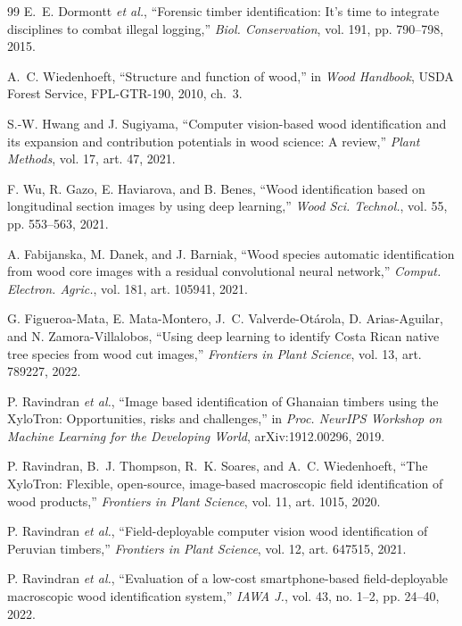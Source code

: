 \begin{thebibliography}{99}
E.~E. Dormontt \emph{et al.}, ``Forensic timber identification: It's time to integrate disciplines to combat illegal logging,'' \emph{Biol. Conservation}, vol. 191, pp. 790--798, 2015.

A.~C. Wiedenhoeft, ``Structure and function of wood,'' in \emph{Wood Handbook}, USDA Forest Service, FPL-GTR-190, 2010, ch.~3.

S.-W. Hwang and J. Sugiyama, ``Computer vision-based wood identification and its expansion and contribution potentials in wood science: A review,'' \emph{Plant Methods}, vol. 17, art. 47, 2021.

F. Wu, R. Gazo, E. Haviarova, and B. Benes, ``Wood identification based on longitudinal section images by using deep learning,'' \emph{Wood Sci. Technol.}, vol. 55, pp. 553--563, 2021.

A. Fabijanska, M. Danek, and J. Barniak, ``Wood species automatic identification from wood core images with a residual convolutional neural network,'' \emph{Comput. Electron. Agric.}, vol. 181, art. 105941, 2021.

G. Figueroa-Mata, E. Mata-Montero, J.~C. Valverde-Ot\'arola, D. Arias-Aguilar, and N. Zamora-Villalobos, ``Using deep learning to identify Costa Rican native tree species from wood cut images,'' \emph{Frontiers in Plant Science}, vol. 13, art. 789227, 2022.

P. Ravindran \emph{et al.}, ``Image based identification of Ghanaian timbers using the XyloTron: Opportunities, risks and challenges,'' in \emph{Proc. NeurIPS Workshop on Machine Learning for the Developing World}, arXiv:1912.00296, 2019.

P. Ravindran, B.~J. Thompson, R.~K. Soares, and A.~C. Wiedenhoeft, ``The XyloTron: Flexible, open-source, image-based macroscopic field identification of wood products,'' \emph{Frontiers in Plant Science}, vol. 11, art. 1015, 2020.

P. Ravindran \emph{et al.}, ``Field-deployable computer vision wood identification of Peruvian timbers,'' \emph{Frontiers in Plant Science}, vol. 12, art. 647515, 2021.

P. Ravindran \emph{et al.}, ``Evaluation of a low-cost smartphone-based field-deployable macroscopic wood identification system,'' \emph{IAWA J.}, vol. 43, no. 1--2, pp. 24--40, 2022.


\end{thebibliography}
